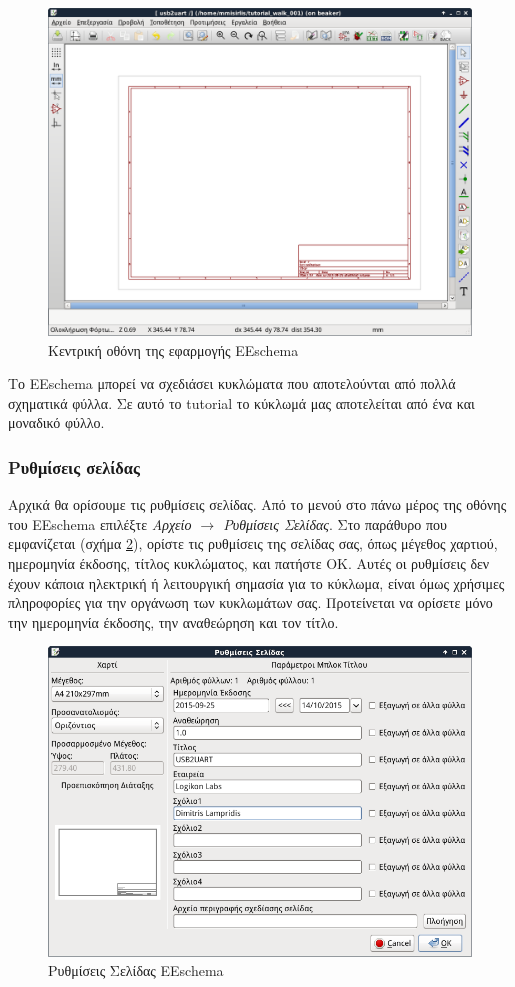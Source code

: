 \documentclass[a4paper]{article}
\begin{document}
\begin{figure}
  \begin{center}
    \includegraphics[width=.9\textwidth]{img/eesch-main-window.png}
    \caption{Κεντρική οθόνη της εφαρμογής \textenglish{EEschema}}
    \label{fig:eesch-main-window}
  \end{center}
\end{figure}

Το \textenglish{EEschema} μπορεί να σχεδιάσει κυκλώματα που αποτελούνται από πολλά σχηματικά φύλλα. Σε αυτό το tutorial το κύκλωμά μας αποτελείται από ένα και μοναδικό φύλλο.

\subsubsection{Ρυθμίσεις σελίδας}
Αρχικά θα ορίσουμε τις ρυθμίσεις σελίδας. Από το μενού στο πάνω μέρος της οθόνης του \textenglish{EEschema} επιλέξτε \textit{Αρχείο $\rightarrow$ Ρυθμίσεις Σελίδας}. Στο παράθυρο που εμφανίζεται (σχήμα \ref{fig:eesch-dial-pagesett}), ορίστε τις ρυθμίσεις της σελίδας σας, όπως μέγεθος χαρτιού, ημερομηνία έκδοσης, τίτλος κυκλώματος, και πατήστε ΟΚ. Αυτές οι ρυθμίσεις δεν έχουν κάποια ηλεκτρική ή λειτουργική σημασία για το κύκλωμα, είναι όμως χρήσιμες πληροφορίες για την οργάνωση των κυκλωμάτων σας. Προτείνεται να ορίσετε μόνο την ημερομηνία έκδοσης, την αναθεώρηση και τον τίτλο.

\begin{figure}
  \begin{center}
    \includegraphics[width=.5\textwidth]{img/eesch-dial-pagesett.png}
    \caption{Ρυθμίσεις Σελίδας \textenglish{EEschema}}
    \label{fig:eesch-dial-pagesett}
  \end{center}
\end{figure}
\end{document}
